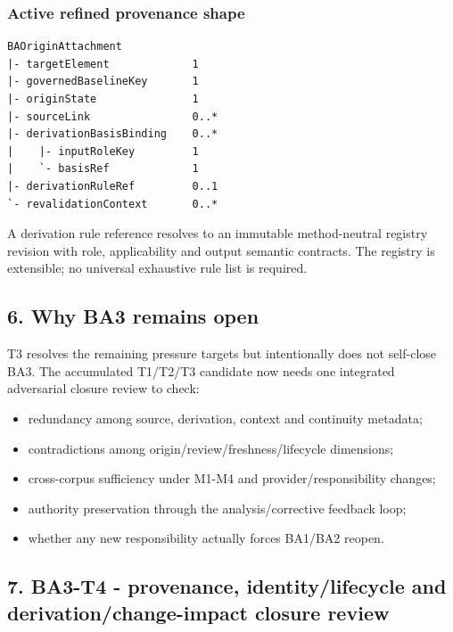 \documentclass[11pt,a4paper]{article}
\providecommand{\tightlist}{\setlength{\itemsep}{0pt}\setlength{\parskip}{0pt}}
\begin{document}
\subsubsection{Active refined provenance
shape}\label{active-refined-provenance-shape}

\begin{verbatim}
BAOriginAttachment
|- targetElement             1
|- governedBaselineKey       1
|- originState               1
|- sourceLink                0..*
|- derivationBasisBinding    0..*
|    |- inputRoleKey         1
|    `- basisRef             1
|- derivationRuleRef         0..1
`- revalidationContext       0..*
\end{verbatim}

A derivation rule reference resolves to an immutable method-neutral
registry revision with role, applicability and output semantic
contracts. The registry is extensible; no universal exhaustive rule list
is required.

\subsection{6. Why BA3 remains open}\label{why-ba3-remains-open}

T3 resolves the remaining pressure targets but intentionally does not
self-close BA3. The accumulated T1/T2/T3 candidate now needs one
integrated adversarial closure review to check:

\begin{itemize}
\tightlist
\item
  redundancy among source, derivation, context and continuity metadata;
\item
  contradictions among origin/review/freshness/lifecycle dimensions;
\item
  cross-corpus sufficiency under M1-M4 and provider/responsibility
  changes;
\item
  authority preservation through the analysis/corrective feedback loop;
\item
  whether any new responsibility actually forces BA1/BA2 reopen.
\end{itemize}

\subsection{7. BA3-T4 - provenance, identity/lifecycle and
derivation/change-impact closure
review}\label{ba3-t4---provenance-identitylifecycle-and-derivationchange-impact-closure-review}
\end{document}
